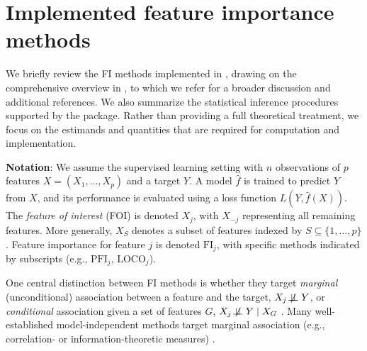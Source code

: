 \section{Implemented feature importance methods}\label{sec-fi-methods}

We briefly review the FI methods implemented in , drawing on the comprehensive overview in \citet{ewald2024guidefeatureb}, to which we refer for a broader discussion and additional references.
We also summarize the statistical inference procedures supported by the package.
Rather than providing a full theoretical treatment, we focus on the estimands and quantities that are required for computation and implementation.

\textbf{Notation}: We assume the supervised learning setting with \(n\) observations of \(p\) features \(X = (X_1, \ldots, X_p)\) and a target \(Y\).
A model \(\hat{f}\) is trained to predict \(Y\) from \(X\), and its performance is evaluated using a loss function \(L(Y, \hat{f}(X))\).
The \emph{feature of interest} (FOI) is denoted \(X_j\), with \(X_{-j}\) representing all remaining features.
More generally, \(X_S\) denotes a subset of features indexed by \(S \subseteq \{1, \ldots, p\}\).
Feature importance for feature \(j\) is denoted \(\text{FI}_j\), with specific methods indicated by subscripts (e.g., \(\text{PFI}_j\), \(\text{LOCO}_j\)).

One central distinction between FI methods is whether they target \emph{marginal} (unconditional) association between a feature and the target, \(X_j \not\!\perp\!\!\!\perp Y\), or \emph{conditional} association given a set of features \(G\), \(X_j \not\!\perp\!\!\!\perp Y \mid X_G\) \citep{strobl2008conditionalvariablec, watson2021testingconditional}.
Many well-established model-independent methods target marginal association (e.g., correlation- or information-theoretic measures) \citep{li2018featureselection, bommert2020benchmarkfilter}.

